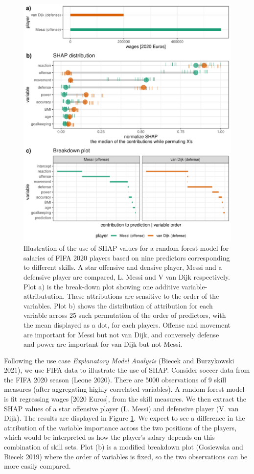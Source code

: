 \documentclass[
]{article}
\begin{document}
\begin{figure}

{\centering \includegraphics[width=0.6\linewidth]{./figures/shap_distr_bd} 

}

\caption{Illustration of the use of SHAP values for a random forest model for salaries of FIFA 2020 players based on nine predictors corresponding to different skills. A star offensive and densive player, Messi and a defensive player are compared, L. Messi and V van Dijk respectively. Plot a) is the break-down plot showing one additive variable-attributution. These attributions are sensitive to the order of the variables. Plot b) shows the distribution of attribution for each variable across 25 such permutation of the order of predictors, with the mean displayed as a dot, for each players. Offense and movement are important for Messi but not van Dijk, and conversely defense and power are important for van Dijk but not Messi.}\label{fig:shapdistrbd}
\end{figure}

Following the use case \emph{Explanatory Model Analysis} (Biecek and Burzykowski 2021), we use FIFA data to illustrate the use of SHAP. Consider soccer data from the FIFA 2020 season (Leone 2020). There are 5000 observations of 9 skill measures (after aggregating highly correlated variables). A random forest model is fit regressing wages {[}2020 Euros{]}, from the skill measures. We then extract the SHAP values of a star offensive player (L. Messi) and defensive player (V. van Dijk). The results are displayed in Figure \ref{fig:shapdistrbd}. We expect to see a difference in the attribution of the variable importance across the two positions of the players, which would be interpreted as how the player's salary depends on this combination of skill sets. Plot (b) is a modified breakdown plot (Gosiewska and Biecek 2019) where the order of variables is fixed, so the two observations can be more easily compared.
\end{document}

